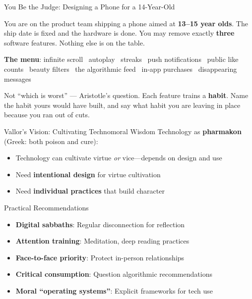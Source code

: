 ﻿\documentclass[aspectratio=169,11pt]{beamer}
\begin{document}
\begin{frame}[shrink=8]{You Be the Judge: Designing a Phone for a 14-Year-Old}
\begin{casestudybox}
\small
You are on the product team shipping a phone aimed at \textbf{13--15 year olds}. The ship date is fixed and the hardware is done. You may remove exactly \textbf{three} software features. Nothing else is on the table.
\end{casestudybox}

\textbf{The menu}: infinite scroll \textbullet\ autoplay \textbullet\ streaks \textbullet\ push notifications \textbullet\ public like counts \textbullet\ beauty filters \textbullet\ the algorithmic feed \textbullet\ in-app purchases \textbullet\ disappearing messages

\begin{discussionbox}
Not ``which is worst'' --- Aristotle's question. Each feature trains a \textbf{habit}. Name the habit yours would have built, and say what habit you are leaving in place because you ran out of cuts.
\end{discussionbox}
\end{frame}


\begin{frame}{Vallor's Vision: Cultivating Technomoral Wisdom}
Technology as \textbf{pharmakon} (Greek: both poison and cure):

\begin{itemize}
    \item Technology can cultivate virtue \textit{or} vice---depends on design and use
    \item Need \textbf{intentional design} for virtue cultivation
    \item Need \textbf{individual practices} that build character
\end{itemize}

\vspace{0.3cm}
\begin{block}{Practical Recommendations}
\begin{itemize}
    \item \textbf{Digital sabbaths}: Regular disconnection for reflection
    \item \textbf{Attention training}: Meditation, deep reading practices
    \item \textbf{Face-to-face priority}: Protect in-person relationships
    \item \textbf{Critical consumption}: Question algorithmic recommendations
    \item \textbf{Moral ``operating systems''}: Explicit frameworks for tech use
\end{itemize}
\end{block}
\end{frame}
\end{document}
